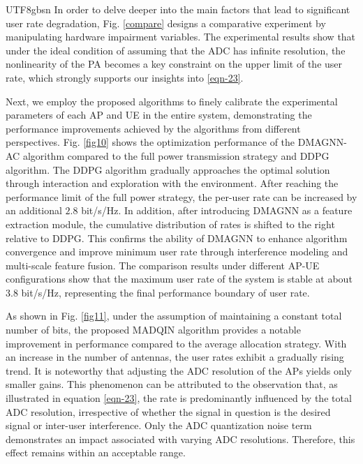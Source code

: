 \documentclass[lettersize,journal]{IEEEtran}
\begin{document}
\begin{CJK}{UTF8}{gbsn}
In order to delve deeper into the main factors that lead to significant user rate degradation, Fig. \ref{compare} designs a comparative experiment by manipulating hardware impairment variables. The experimental results show that under the ideal condition of assuming that the ADC has infinite resolution, the nonlinearity of the PA becomes a key constraint on the upper limit of the user rate, which strongly supports our insights into \eqref{eqn-23}. 

Next, we employ the proposed algorithms to finely calibrate the experimental parameters of each AP and UE in the entire system, demonstrating the performance improvements achieved by the algorithms from different perspectives. Fig. \ref{fig10} shows the optimization performance of the DMAGNN-AC algorithm compared to the full power transmission strategy and DDPG algorithm. The DDPG algorithm gradually approaches the optimal solution through interaction and exploration with the environment. After reaching the performance limit of the full power strategy, the per-user rate can be increased by an additional $2.8$ bit/s/Hz. In addition, after introducing DMAGNN as a feature extraction module, the cumulative distribution of rates is shifted to the right relative to DDPG. This confirms the ability of DMAGNN to enhance algorithm convergence and improve minimum user rate through interference modeling and multi-scale feature fusion. The comparison results under different AP-UE configurations show that the maximum user rate of the system is stable at about $3.8$ bit/s/Hz, representing the final performance boundary of user rate.

As shown in Fig. \ref{fig11}, under the assumption of maintaining a constant total number of bits, the proposed MADQIN algorithm provides a notable improvement in performance compared to the average allocation strategy. With an increase in the number of antennas, the user rates exhibit a gradually rising trend. It is noteworthy that adjusting the ADC resolution of the APs yields only smaller gains. This phenomenon can be attributed to the observation that, as illustrated in equation \eqref{eqn-23}, the rate is predominantly influenced by the total ADC resolution, irrespective of whether the signal in question is the desired signal or inter-user interference. Only the ADC quantization noise term demonstrates an impact associated with varying ADC resolutions. Therefore, this effect remains within an acceptable range.


\end{CJK}
\end{document}
